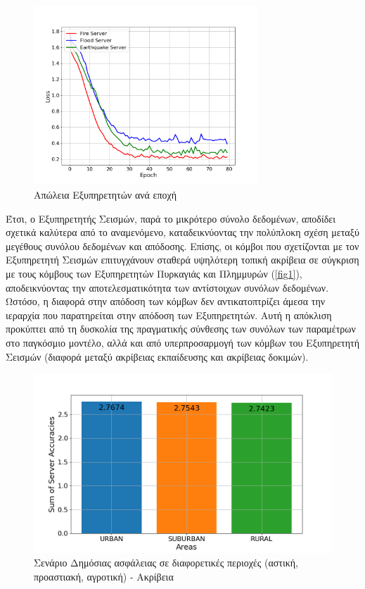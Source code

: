 \newpage

\begin{figure}[ht]
    \centering
    \includegraphics[width=0.75\textwidth]{figures/chapter2/Server_Losses.png}
    \caption{Απώλεια Εξυπηρετητών ανά εποχή}
    \label{fig4}
\end{figure}

Έτσι, ο Εξυπηρετητής Σεισμών, παρά το μικρότερο σύνολο δεδομένων, αποδίδει σχετικά καλύτερα από το αναμενόμενο, καταδεικνύοντας την πολύπλοκη σχέση μεταξύ μεγέθους συνόλου δεδομένων και απόδοσης. Επίσης, οι κόμβοι που σχετίζονται με τον Εξυπηρετητή Σεισμών επιτυγχάνουν σταθερά υψηλότερη τοπική ακρίβεια σε σύγκριση με τους κόμβους των Εξυπηρετητών Πυρκαγιάς και Πλημμυρών (\ref{fig1}), αποδεικνύοντας την αποτελεσματικότητα των αντίστοιχων συνόλων δεδομένων. Ωστόσο, η διαφορά στην απόδοση των κόμβων δεν αντικατοπτρίζει άμεσα την ιεραρχία που παρατηρείται στην απόδοση των Εξυπηρετητών. Αυτή η απόκλιση προκύπτει από τη δυσκολία της πραγματικής σύνθεσης των συνόλων των παραμέτρων στο παγκόσμιο μοντέλο, αλλά και από υπερπροσαρμογή των κόμβων του Εξυπηρετητή Σεισμών (διαφορά μεταξύ ακρίβειας εκπαίδευσης και ακρίβειας δοκιμών).

\newpage

\begin{figure}[H]
    \centering
    \includegraphics[width=\textwidth]{figures/chapter2/Sum_of_Accuracies_per_Area.png}
    \caption{Σενάριο Δημόσιας ασφάλειας σε διαφορετικές περιοχές (αστική, προαστιακή, αγροτική) - Ακρίβεια}
    \label{fig5}
\end{figure}

